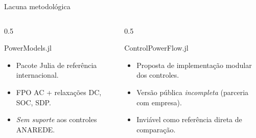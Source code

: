 \documentclass{libs/ufc_format}
\begin{document}
\begin{frame}{Lacuna metodológica}
    \begin{columns}
        \begin{column}{0.5\textwidth}
            \begin{block}{PowerModels.jl~\cite{coffrin2018powermodels}}
                \begin{itemize}
                    \item Pacote Julia de referência internacional.
                    \item FPO AC + relaxações DC, SOC, SDP.
                    \item \emph{Sem suporte} aos controles ANAREDE.
                \end{itemize}
            \end{block}
        \end{column}
        \begin{column}{0.5\textwidth}
            \begin{alertblock}{ControlPowerFlow.jl~\cite{chavarry2024}}
                \begin{itemize}
                    \item Proposta de implementação modular dos controles.
                    \item Versão pública \emph{incompleta} (parceria com empresa).
                    \item Inviável como referência direta de comparação.
                \end{itemize}
            \end{alertblock}
        \end{column}
    \end{columns}

    \vspace{0.4cm}
\end{frame}
\end{document}
